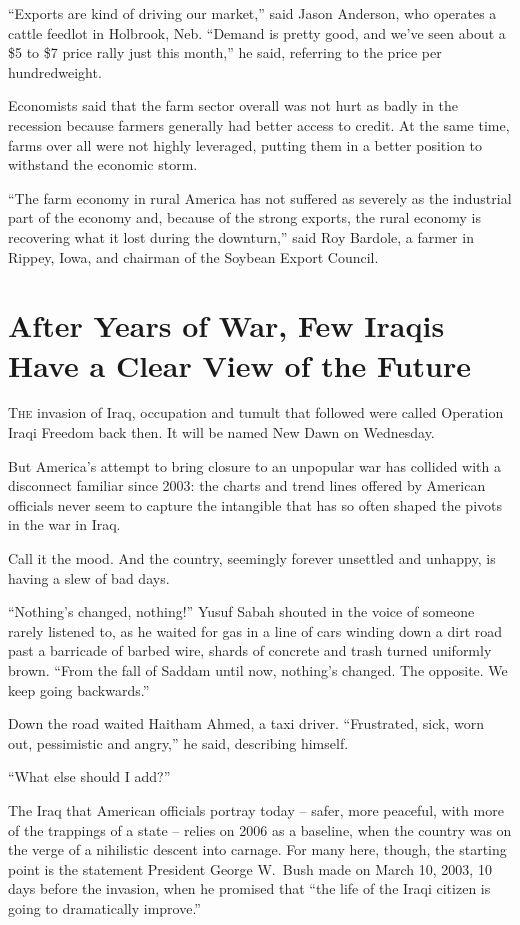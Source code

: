 ﻿\documentclass[12pt]{article}
\begin{document}
``Exports are kind of driving our market,'' said Jason Anderson, who operates a cattle feedlot in
Holbrook, Neb. ``Demand is pretty good, and we've seen about a \$5 to \$7 price rally just this
month,'' he said, referring to the price per hundredweight.

Economists said that the farm sector overall was not hurt as badly in the recession because farmers
generally had better access to credit. At the same time, farms over all were not highly leveraged,
putting them in a better position to withstand the economic storm.

``The farm economy in rural America has not suffered as severely as the industrial part of the
economy and, because of the strong exports, the rural economy is recovering what it lost during the
downturn,'' said Roy Bardole, a farmer in Rippey, Iowa, and chairman of the Soybean Export Council.

\pagebreak
\section{After Years of War, Few Iraqis Have a Clear View of the Future}

\lettrine{T}{he} invasion of Iraq, occupation and tumult that followed were
called Operation Iraqi Freedom back then. It will be named New Dawn on Wednesday.

But America's attempt to bring closure to an unpopular war has collided with a disconnect familiar
since 2003: the charts and trend lines offered by American officials never seem to capture the
intangible that has so often shaped the pivots in the war in Iraq.

Call it the mood. And the country, seemingly forever unsettled and unhappy, is having a slew of bad
days.

``Nothing's changed, nothing!'' Yusuf Sabah shouted in the voice of someone rarely listened to, as
he waited for gas in a line of cars winding down a dirt road past a barricade of barbed wire, shards
of concrete and trash turned uniformly brown. ``From the fall of Saddam until now, nothing's
changed. The opposite. We keep going backwards.''

Down the road waited Haitham Ahmed, a taxi driver. ``Frustrated, sick, worn out, pessimistic and
angry,'' he said, describing himself.

``What else should I add?''

The Iraq that American officials portray today -- safer, more peaceful, with more of the trappings
of a state -- relies on 2006 as a baseline, when the country was on the verge of a nihilistic
descent into carnage. For many here, though, the starting point is the statement President George
W.~Bush made on March 10, 2003, 10 days before the invasion, when he promised that ``the life of the
Iraqi citizen is going to dramatically improve.''
\end{document}
